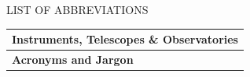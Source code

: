 
\begin{center}
LIST OF ABBREVIATIONS

{}

\begin{tabular}{rl}
\toprule
\multicolumn{2}{l}{\textbf{Instruments, Telescopes \& Observatories}} \\
\midrule

\toprule
\multicolumn{2}{l}{\textbf{Acronyms and Jargon}} \\
\midrule
\end{tabular}


\end{center}


